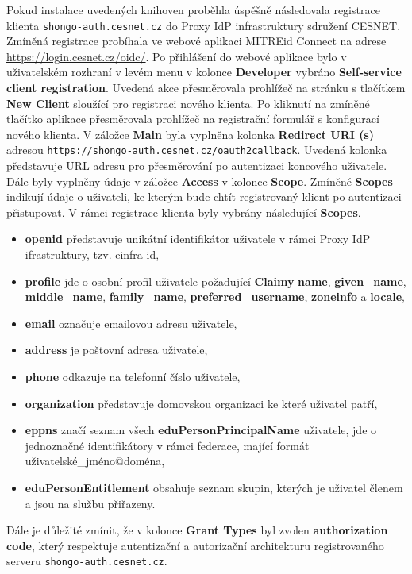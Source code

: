 \documentclass[
  printed, %
  twoside, %
  table,   %
  nolof,     %
  nolot,     %
]{fithesis3}
\begin{document}
Pokud instalace uvedených knihoven proběhla úspěšně následovala registrace klienta \texttt{shongo-auth.cesnet.cz} do Proxy IdP infrastruktury sdružení CESNET. Zmíněná registrace probíhala ve webové aplikaci MITREid Connect na adrese \url{https://login.cesnet.cz/oidc/}. Po přihlášení do webové aplikace bylo v uživatelském rozhraní v levém menu v kolonce \textbf{Developer} vybráno \textbf{Self-service client registration}. Uvedená akce přesměrovala prohlížeč na stránku s tlačítkem \textbf{New Client} sloužící pro registraci nového klienta. Po kliknutí na zmíněné tlačítko aplikace přesměrovala prohlížeč na registrační formulář s konfigurací nového klienta. V záložce \textbf{Main} byla vyplněna kolonka \textbf{Redirect URI (s)} adresou \texttt{https://shongo-auth.cesnet.cz/oauth2callback}. Uvedená kolonka představuje URL adresu pro přesměrování po autentizaci koncového uživatele. Dále byly vyplněny údaje v záložce \textbf{Access} v kolonce \textbf{Scope}. Zmíněné \textbf{Scopes} indikují údaje o uživateli, ke kterým bude chtít registrovaný klient po autentizaci přistupovat. V rámci registrace klienta byly vybrány následující \textbf{Scopes}.
\begin{itemize}
    \item \textbf{openid} představuje unikátní identifikátor uživatele v rámci Proxy IdP ifrastruktury, tzv. einfra id,
    \item \textbf{profile} jde o osobní profil uživatele požadující \textbf{Claimy} \textbf{name}, \textbf{given\_name}, \textbf{middle\_name}, \textbf{family\_name}, \textbf{preferred\_username}, \textbf{zoneinfo} a \textbf{locale},
    \item \textbf{email} označuje emailovou adresu uživatele,
    \item \textbf{address} je poštovní adresa uživatele,
    \item \textbf{phone} odkazuje na telefonní číslo uživatele,
    
    \item \textbf{organization} představuje domovskou organizaci ke které uživatel patří,
    \item \textbf{eppns} značí seznam všech \textbf{eduPersonPrincipalName} uživatele, jde o jednoznačné identifikátory v rámci federace, mající formát uživatelské\_jméno@doména,  
    \item \textbf{eduPersonEntitlement} obsahuje seznam skupin, kterých je uživatel členem a jsou na službu přiřazeny.
    
\end{itemize}
Dále je důležité zmínit, že v kolonce \textbf{Grant Types} byl zvolen \textbf{authorization code}, který respektuje autentizační a autorizační architekturu registrovaného serveru \texttt{shongo-auth.cesnet.cz}.  \par
\end{document}

